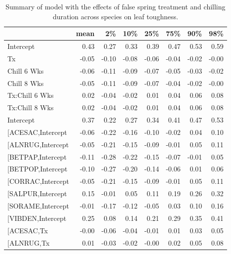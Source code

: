 \documentclass{article}\usepackage[]{graphicx}\usepackage[]{color}
\makeatletter
\newenvironment{kframe}{%
 \def\at@end@of@kframe{}%
 \ifinner\ifhmode%
  \def\at@end@of@kframe{\end{minipage}}%
  \begin{minipage}{\columnwidth}%
 \fi\fi%
 \def\FrameCommand##1{\hskip\@totalleftmargin \hskip-\fboxsep
 \colorbox{shadecolor}{##1}\hskip-\fboxsep
     \hskip-\linewidth \hskip-\@totalleftmargin \hskip\columnwidth}%
 \MakeFramed {\advance\hsize-\width
   \@totalleftmargin\z@ \linewidth\hsize
   \@setminipage}}%
 {\par\unskip\endMakeFramed%
 \at@end@of@kframe}
\makeatother
\begin{document}
\newpage
\begin{kframe}


{\ttfamily\noindent\bfseries\color{errorcolor}{\#\# Error in gsub("{}["{}, "{}"{}, modoutput\$term): invalid regular expression '[', reason 'Missing ']''}}\end{kframe}%
\begin{longtable}{lrrrrrrr}
\caption{Summary of model with the effects of false spring treatment and chilling duration across species on leaf toughness.} \\ 
  \hline
 & mean & 2\% & 10\% & 25\% & 75\% & 90\% & 98\% \\ 
  \hline \endhead  \hline
Intercept & 0.43 & 0.27 & 0.33 & 0.39 & 0.47 & 0.53 & 0.59 \\ 
  Tx & -0.05 & -0.10 & -0.08 & -0.06 & -0.04 & -0.02 & -0.00 \\ 
  Chill 6 Wks & -0.06 & -0.11 & -0.09 & -0.07 & -0.05 & -0.03 & -0.02 \\ 
  Chill 8 Wks & -0.05 & -0.11 & -0.09 & -0.07 & -0.04 & -0.02 & -0.00 \\ 
  Tx:Chill 6 Wks & 0.02 & -0.04 & -0.02 & 0.01 & 0.04 & 0.06 & 0.08 \\ 
  Tx:Chill 8 Wks & 0.02 & -0.04 & -0.02 & 0.01 & 0.04 & 0.06 & 0.08 \\ 
  Intercept & 0.37 & 0.22 & 0.27 & 0.34 & 0.41 & 0.47 & 0.53 \\ 
  [ACESAC,Intercept & -0.06 & -0.22 & -0.16 & -0.10 & -0.02 & 0.04 & 0.10 \\ 
  [ALNRUG,Intercept & -0.05 & -0.21 & -0.15 & -0.09 & -0.01 & 0.05 & 0.11 \\ 
  [BETPAP,Intercept & -0.11 & -0.28 & -0.22 & -0.15 & -0.07 & -0.01 & 0.05 \\ 
  [BETPOP,Intercept & -0.10 & -0.27 & -0.20 & -0.14 & -0.06 & 0.01 & 0.06 \\ 
  [CORRAC,Intercept & -0.05 & -0.21 & -0.15 & -0.09 & -0.01 & 0.05 & 0.11 \\ 
  [SALPUR,Intercept & 0.15 & -0.01 & 0.05 & 0.11 & 0.19 & 0.26 & 0.32 \\ 
  [SORAME,Intercept & -0.01 & -0.17 & -0.12 & -0.05 & 0.03 & 0.10 & 0.16 \\ 
  [VIBDEN,Intercept & 0.25 & 0.08 & 0.14 & 0.21 & 0.29 & 0.35 & 0.41 \\ 
  [ACESAC,Tx & -0.00 & -0.06 & -0.04 & -0.01 & 0.01 & 0.03 & 0.05 \\ 
  [ALNRUG,Tx & 0.01 & -0.03 & -0.02 & -0.00 & 0.02 & 0.05 & 0.08 \\ 

\end{longtable}
\end{document}
